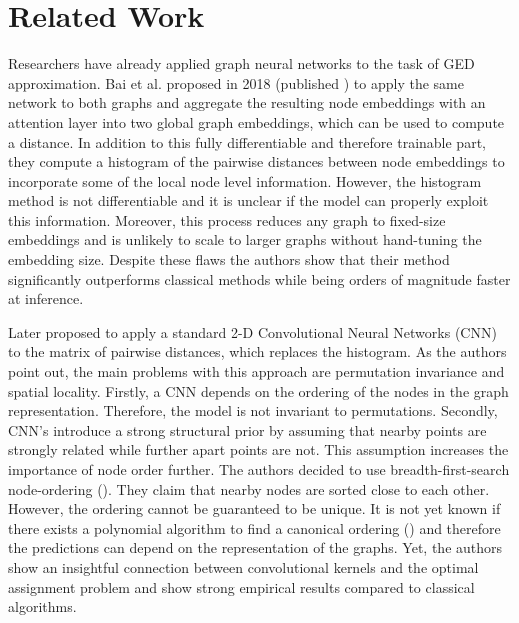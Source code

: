 \section{Related Work}
\label{section:related_work}

Researchers have already applied graph neural networks to the task of GED approximation. Bai et al. proposed in 2018 (published \citealp{bai2019}) to apply the same network to both graphs and aggregate the resulting node embeddings with an attention layer into two global graph embeddings, which can be used to compute a distance. In addition to this fully differentiable and therefore trainable part, they compute a histogram of the pairwise distances between node embeddings to incorporate some of the local node level information. However, the histogram method is not differentiable and it is unclear if the model can properly exploit this information. Moreover, this process reduces any graph to fixed-size embeddings and is unlikely to scale to larger graphs without hand-tuning the embedding size. Despite these flaws the authors show that their method significantly outperforms classical methods while being orders of magnitude faster at inference.

Later \cite{bai2018_cnn1} proposed to apply a standard 2-D Convolutional Neural Networks (CNN) to the matrix of pairwise distances, which replaces the histogram. As the authors point out, the main problems with this approach are permutation invariance and spatial locality. Firstly, a CNN depends on the ordering of the nodes in the graph representation. Therefore, the model is not invariant to permutations. Secondly, CNN's introduce a strong structural prior by assuming that nearby points are strongly related while further apart points are not. This assumption increases the importance of node order further. The authors decided to use breadth-first-search node-ordering (\citealp{bfs2018}). They claim that nearby nodes are sorted close to each other. However, the ordering cannot be guaranteed to be unique. It is not yet known if there exists a polynomial algorithm to find a canonical ordering (\citealp{canonical2016}) and therefore the predictions can depend on the representation of the graphs. Yet, the authors show an insightful connection between convolutional kernels and the optimal assignment problem and show strong empirical results compared to classical algorithms.

